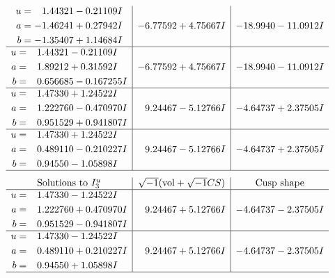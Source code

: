 \documentclass[1p]{elsarticle_modified}
\theoremstyle{definition}
\newcommand{\I}{\sqrt{-1}}
\begin{document}
$$\begin{array}{c|c|c}
\begin{aligned}
u &= \phantom{-}1.44321 - 0.21109 I \\
a &= -1.46241 + 0.27942 I \\
b &= -1.35407 + 1.14684 I\end{aligned}
 & -6.77592 + 4.75667 I & -18.9940 - 11.0912 I \\ \hline\begin{aligned}
u &= \phantom{-}1.44321 - 0.21109 I \\
a &= \phantom{-}1.89212 + 0.31592 I \\
b &= \phantom{-}0.656685 - 0.167255 I\end{aligned}
 & -6.77592 + 4.75667 I & -18.9940 - 11.0912 I \\ \hline\begin{aligned}
u &= \phantom{-}1.47330 + 1.24522 I \\
a &= \phantom{-}1.222760 - 0.470970 I \\
b &= \phantom{-}0.951529 + 0.941807 I\end{aligned}
 & \phantom{-}9.24467 - 5.12766 I & -4.64737 + 2.37505 I \\ \hline\begin{aligned}
u &= \phantom{-}1.47330 + 1.24522 I \\
a &= \phantom{-}0.489110 - 0.210227 I \\
b &= \phantom{-}0.94550 - 1.05898 I\end{aligned}
 & \phantom{-}9.24467 - 5.12766 I & -4.64737 + 2.37505 I\\
 \hline 
 \end{array}$$\newpage$$\begin{array}{c|c|c}  
\text{Solutions to }I^u_{3}& \I (\text{vol} + \sqrt{-1}CS) & \text{Cusp shape}\\
 \hline 
\begin{aligned}
u &= \phantom{-}1.47330 - 1.24522 I \\
a &= \phantom{-}1.222760 + 0.470970 I \\
b &= \phantom{-}0.951529 - 0.941807 I\end{aligned}
 & \phantom{-}9.24467 + 5.12766 I & -4.64737 - 2.37505 I \\ \hline\begin{aligned}
u &= \phantom{-}1.47330 - 1.24522 I \\
a &= \phantom{-}0.489110 + 0.210227 I \\
b &= \phantom{-}0.94550 + 1.05898 I\end{aligned}
 & \phantom{-}9.24467 + 5.12766 I & -4.64737 - 2.37505 I\\
 \hline 
 \end{array}$$\newpage\newpage\renewcommand{\arraystretch}{1}
\end{document}
